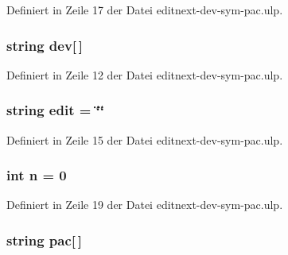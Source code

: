 Definiert in Zeile 17 der Datei editnext-\/dev-\/sym-\/pac.\+ulp.

\hypertarget{editnext-dev-sym-pac_8ulp_af87dd7ae8e527b31308923149d6841e1}{}
\subsubsection[{dev}]{\setlength{\rightskip}{0pt plus 5cm}string dev\mbox{[}$\,$\mbox{]}}\label{editnext-dev-sym-pac_8ulp_af87dd7ae8e527b31308923149d6841e1}


Definiert in Zeile 12 der Datei editnext-\/dev-\/sym-\/pac.\+ulp.

\hypertarget{editnext-dev-sym-pac_8ulp_a03c320515aeefc0c276c51607ca8a5eb}{}
\subsubsection[{edit}]{\setlength{\rightskip}{0pt plus 5cm}string edit = \char`\"{}\char`\"{}}\label{editnext-dev-sym-pac_8ulp_a03c320515aeefc0c276c51607ca8a5eb}


Definiert in Zeile 15 der Datei editnext-\/dev-\/sym-\/pac.\+ulp.

\hypertarget{editnext-dev-sym-pac_8ulp_a76f11d9a0a47b94f72c2d0e77fb32240}{}
\subsubsection[{n}]{\setlength{\rightskip}{0pt plus 5cm}int n = 0}\label{editnext-dev-sym-pac_8ulp_a76f11d9a0a47b94f72c2d0e77fb32240}


Definiert in Zeile 19 der Datei editnext-\/dev-\/sym-\/pac.\+ulp.

\hypertarget{editnext-dev-sym-pac_8ulp_aabdb88a547fddc24ea086330593761c2}{}
\subsubsection[{pac}]{\setlength{\rightskip}{0pt plus 5cm}string pac\mbox{[}$\,$\mbox{]}}\label{editnext-dev-sym-pac_8ulp_aabdb88a547fddc24ea086330593761c2}


